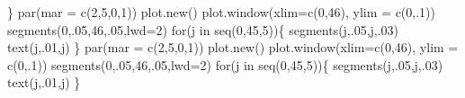 \documentclass[
  letterpaper,
  DIV=11,
  numbers=noendperiod]{scrreprt}
\newenvironment{Shaded}{\begin{snugshade}}{\end{snugshade}}
\newcommand{\AttributeTok}[1]{\textcolor[rgb]{0.40,0.45,0.13}{#1}}
\newcommand{\ControlFlowTok}[1]{\textcolor[rgb]{0.00,0.23,0.31}{#1}}
\newcommand{\DecValTok}[1]{\textcolor[rgb]{0.68,0.00,0.00}{#1}}
\newcommand{\FunctionTok}[1]{\textcolor[rgb]{0.28,0.35,0.67}{#1}}
\newcommand{\NormalTok}[1]{\textcolor[rgb]{0.00,0.23,0.31}{#1}}
\theoremstyle{definition}
\theoremstyle{definition}
\theoremstyle{remark}
\begin{document}
\begin{Shaded}
\begin{Highlighting}[]
\NormalTok{\}}
  \FunctionTok{par}\NormalTok{(}\AttributeTok{mar =} \FunctionTok{c}\NormalTok{(}\DecValTok{2}\NormalTok{,}\DecValTok{5}\NormalTok{,}\DecValTok{0}\NormalTok{,}\DecValTok{1}\NormalTok{))}
  \FunctionTok{plot.new}\NormalTok{()}
  \FunctionTok{plot.window}\NormalTok{(}\AttributeTok{xlim=}\FunctionTok{c}\NormalTok{(}\DecValTok{0}\NormalTok{,}\DecValTok{46}\NormalTok{), }\AttributeTok{ylim =} \FunctionTok{c}\NormalTok{(}\DecValTok{0}\NormalTok{,.}\DecValTok{1}\NormalTok{))}
  \FunctionTok{segments}\NormalTok{(}\DecValTok{0}\NormalTok{,.}\DecValTok{05}\NormalTok{,}\DecValTok{46}\NormalTok{,.}\DecValTok{05}\NormalTok{,}\AttributeTok{lwd=}\DecValTok{2}\NormalTok{)}
 \ControlFlowTok{for}\NormalTok{(j }\ControlFlowTok{in} \FunctionTok{seq}\NormalTok{(}\DecValTok{0}\NormalTok{,}\DecValTok{45}\NormalTok{,}\DecValTok{5}\NormalTok{))\{}
    \FunctionTok{segments}\NormalTok{(j,.}\DecValTok{05}\NormalTok{,j,.}\DecValTok{03}\NormalTok{)}
    \FunctionTok{text}\NormalTok{(j,.}\DecValTok{01}\NormalTok{,j)}
\NormalTok{  \}}
    \FunctionTok{par}\NormalTok{(}\AttributeTok{mar =} \FunctionTok{c}\NormalTok{(}\DecValTok{2}\NormalTok{,}\DecValTok{5}\NormalTok{,}\DecValTok{0}\NormalTok{,}\DecValTok{1}\NormalTok{))}
  \FunctionTok{plot.new}\NormalTok{()}
  \FunctionTok{plot.window}\NormalTok{(}\AttributeTok{xlim=}\FunctionTok{c}\NormalTok{(}\DecValTok{0}\NormalTok{,}\DecValTok{46}\NormalTok{), }\AttributeTok{ylim =} \FunctionTok{c}\NormalTok{(}\DecValTok{0}\NormalTok{,.}\DecValTok{1}\NormalTok{))}
  \FunctionTok{segments}\NormalTok{(}\DecValTok{0}\NormalTok{,.}\DecValTok{05}\NormalTok{,}\DecValTok{46}\NormalTok{,.}\DecValTok{05}\NormalTok{,}\AttributeTok{lwd=}\DecValTok{2}\NormalTok{)}
  \ControlFlowTok{for}\NormalTok{(j }\ControlFlowTok{in} \FunctionTok{seq}\NormalTok{(}\DecValTok{0}\NormalTok{,}\DecValTok{45}\NormalTok{,}\DecValTok{5}\NormalTok{))\{}
    \FunctionTok{segments}\NormalTok{(j,.}\DecValTok{05}\NormalTok{,j,.}\DecValTok{03}\NormalTok{)}
    \FunctionTok{text}\NormalTok{(j,.}\DecValTok{01}\NormalTok{,j)}
\NormalTok{  \}}
\end{Highlighting}
\end{Shaded}
\end{document}
